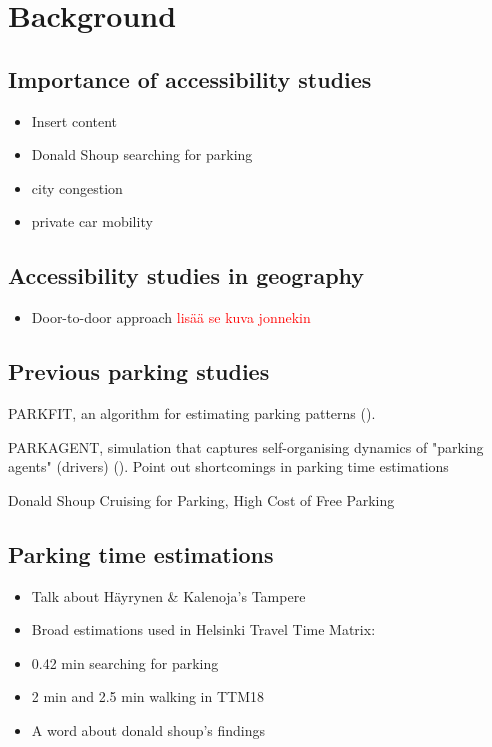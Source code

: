 \section{Background}
\subsection{Importance of accessibility studies}
\justify

\begin{itemize}
    \item Insert content
    \item Donald Shoup searching for parking
    \item city congestion
    \item private car mobility
\end{itemize}

\newpage
\subsection{Accessibility studies in geography}
\justify

\begin{itemize}
  \item Door-to-door approach \textcolor{red}{lisää se kuva jonnekin}
\end{itemize}

\newpage
\subsection{Previous parking studies}
\justify

PARKFIT, an algorithm for estimating parking patterns (\cite{Levy2015}).

PARKAGENT, simulation that captures self-organising dynamics of "parking agents" (drivers) (\cite{Benenson2008}). Point out shortcomings in parking time estimations

Donald Shoup Cruising for Parking, High Cost of Free Parking

\newpage
\subsection{Parking time estimations}
\justify

\begin{itemize}
  \item Talk about Häyrynen \& Kalenoja's Tampere
  \item Broad estimations used in Helsinki Travel Time Matrix:
  \item 0.42 min searching for parking
  \item 2 min and 2.5 min walking in TTM18
  \item A word about donald shoup's findings
\end{itemize}

